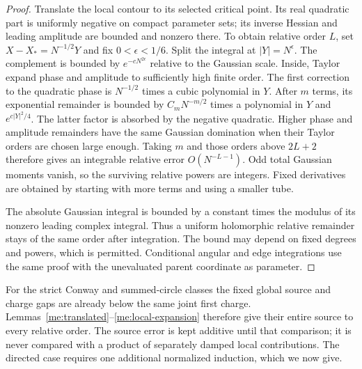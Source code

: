 \begin{proof}
Translate the local contour to its selected critical point. Its
real quadratic part is uniformly negative on compact parameter
sets; its inverse Hessian and leading amplitude are bounded and
nonzero there. To obtain relative order $L$, set $X-X_*=N^{-1/2}Y$ and fix
$0<\epsilon<1/6$. Split the integral at $|Y|=N^\epsilon$.
The complement is bounded by $e^{-cN^{2\epsilon}}$ relative to
the Gaussian scale. Inside, Taylor expand phase and amplitude to
sufficiently high finite order. The first correction to the quadratic
phase is $N^{-1/2}$ times a cubic polynomial in $Y$. After $m$ terms,
its exponential remainder is bounded by $C_mN^{-m/2}$ times a
polynomial in $Y$ and $e^{c|Y|^2/4}$. The latter factor is absorbed
by the negative quadratic. Higher phase and amplitude remainders
have the same Gaussian domination when their Taylor orders are chosen
large enough. Taking $m$ and those orders above $2L+2$ therefore
gives an integrable relative error $O(N^{-L-1})$. Odd total Gaussian
moments vanish, so the surviving relative powers are integers.
Fixed derivatives are
obtained by starting with more terms and using a smaller tube.

The absolute Gaussian integral is bounded by a constant times the
modulus of its nonzero leading complex integral. Thus a uniform
holomorphic relative remainder stays of the same order after
integration. The bound may depend on fixed degrees and powers,
which is permitted. Conditional angular and edge integrations use the same
proof with the unevaluated parent coordinate as parameter.
\end{proof}

For the strict Conway and summed-circle classes the fixed global
source and charge gaps are already below the same joint first
charge. Lemmas~\ref{me:translated}--\ref{me:local-expansion}
therefore give their entire source to every relative order. The
source error is kept additive until that comparison; it is never
compared with a product of separately damped local contributions.
The directed case requires one additional normalized induction,
which we now give.
